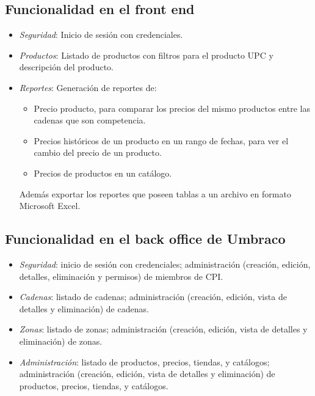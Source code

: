 \subsection{Funcionalidad en el front end}
\begin{itemize}
    \item \emph{Seguridad}: Inicio de sesión con credenciales.
    
    \item \emph{Productos}: Listado de productos con filtros para el producto UPC y descripción del producto. 

    \item \emph{Reportes}: Generación de reportes de:
            \begin{itemize}
                 \item Precio producto, para comparar los precios del mismo productos entre las cadenas que son competencia.
                 \item Precios históricos de un producto en un rango de fechas, para ver el cambio del precio de un producto.
                 \item Precios de productos en un catálogo.
            \end{itemize}

          Además exportar los reportes que poseen tablas a un archivo en formato Microsoft Excel.
 
\end{itemize}

\subsection{Funcionalidad en el back office de Umbraco}
\begin{itemize}
    \item \emph{Seguridad}: inicio de sesión con credenciales; administración (creación, edición, detalles, eliminación y permisos) de miembros de CPI.
    
    \item \emph{Cadenas}: listado de cadenas; administración (creación, edición, vista de detalles y eliminación) de cadenas.
    
    \item \emph{Zonas}: listado de zonas; administración (creación, edición, vista de detalles y eliminación) de zonas.
    
    \item \emph{Administración}: listado de productos, precios, tiendas, y catálogos; administración (creación, edición, vista de detalles y eliminación) de productos, precios, tiendas, y catálogos. 
\end{itemize}
